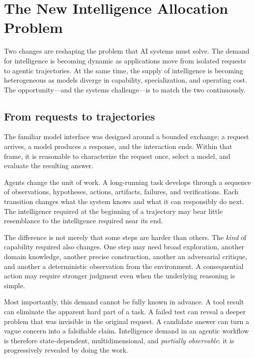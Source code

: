 \section{The New Intelligence Allocation Problem}

Two changes are reshaping the problem that AI systems must solve. The demand
for intelligence is becoming dynamic as applications move from isolated
requests to agentic trajectories. At the same time, the supply of intelligence
is becoming heterogeneous as models diverge in capability, specialization, and
operating cost. The opportunity---and the systems challenge---is to match the
two continuously.

\subsection{From requests to trajectories}

The familiar model interface was designed around a bounded exchange: a request
arrives, a model produces a response, and the interaction ends. Within that
frame, it is reasonable to characterize the request once, select a model, and
evaluate the resulting answer.

Agents change the unit of work. A long-running task develops through a sequence
of observations, hypotheses, actions, artifacts, failures, and verifications.
Each transition changes what the system knows and what it can responsibly do
next. The intelligence required at the beginning of a trajectory may bear
little resemblance to the intelligence required near its end.

The difference is not merely that some steps are harder than others. The
\emph{kind} of capability required also changes. One step may need broad
exploration, another domain knowledge, another precise construction, another
an adversarial critique, and another a deterministic observation from the
environment. A consequential action may require stronger judgment even when
the underlying reasoning is simple.

Most importantly, this demand cannot be fully known in advance. A tool result
can eliminate the apparent hard part of a task. A failed test can reveal a
deeper problem that was invisible in the original request. A candidate answer
can turn a vague concern into a falsifiable claim. Intelligence demand in an
agentic workflow is therefore state-dependent, multidimensional, and
\emph{partially observable}: it is progressively revealed by doing the work.

